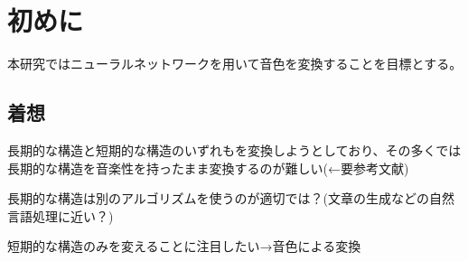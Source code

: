 \chapter{初めに}


本研究ではニューラルネットワークを用いて音色を変換することを目標とする。







\section{着想}


長期的な構造と短期的な構造のいずれもを変換しようとしており、その多くでは長期的な構造を音楽性を持ったまま変換するのが難しい(←要参考文献)

長期的な構造は別のアルゴリズムを使うのが適切では？(文章の生成などの自然言語処理に近い？)

短期的な構造のみを変えることに注目したい→音色による変換
